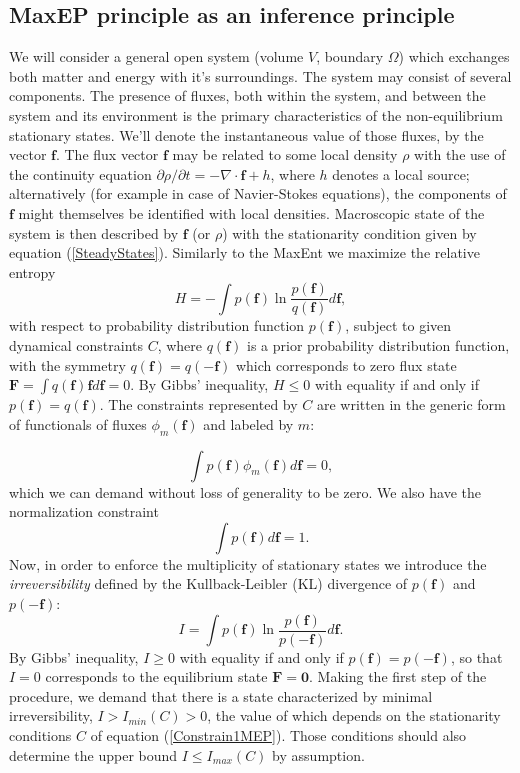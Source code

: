 \documentclass[a4paper,12pt]{article}
\begin{document}
\subsection{MaxEP principle as an inference principle}
\label{MaxEPInferenceSection}
We will consider a general open system (volume $V$, boundary $\Omega$) which exchanges both matter and energy with it's surroundings. The system may consist of several components.
The presence of fluxes, both within the system, and between the system and its environment is the primary characteristics of the non-equilibrium stationary states. We'll denote the instantaneous value of those fluxes, by the vector $\bm{f}$. The flux vector $\bm{f}$ may be related to some local density $\rho$ with the use of the continuity equation $\partial \rho / \partial t =  - \nabla \cdot \bm{f} + h$, where $h$ denotes a local source; alternatively (for example in case of Navier-Stokes equations), the components of $\bm{f}$ might themselves be identified with local densities. Macroscopic state of the system is then described by $\bm{f}$ (or $\rho$) with the stationarity condition given by equation (\ref{SteadyStates}).
Similarly to the MaxEnt we maximize the relative entropy
\begin{equation}
  H = - \int p(\bm{f})\ln \frac{p(\bm{f})}{q(\bm{f})} d\bm{f},
\end{equation}
with respect to probability distribution function $p(\bm{f})$, subject to given dynamical constraints $C$, where $q(\bm{f})$ is a prior probability distribution function, with the symmetry $q(\bm{f}) =q(\bm{-f})$ which corresponds to zero flux state $\bm{F}= \int q(\bm{f}) \bm{f} d\bm{f}=0 $.
By Gibbs' inequality, $H \leq 0$ with equality if and only if $p(\bm{f})=q(\bm{f})$.
The constraints represented by $C$ are written in the generic form of functionals of fluxes $\phi_m(\bm{f})$ and labeled by $m$:

\begin{equation}
\label{Constrain1MEP}
  \int p(\bm{f})\phi_m(\bm{f})d\bm{f} =0,
\end{equation}
which we can demand without loss of generality to be zero.
We also have the normalization constraint
\begin{equation}
\label{Constrain2MEP}
  \int p(\bm{f})d\bm{f} = 1.
\end{equation}
Now, in order to enforce the multiplicity of stationary states we introduce the \textit{irreversibility} defined by the Kullback-Leibler (KL) divergence of $p(\bm{f})$ and $p(-\bm{f})$:
\begin{equation}
\label{IrreversibilityMeasure}
  I= \int p(\bm{f}) \ln \frac{p(\bm{f})}{p(-\bm{f})} d\bm{f}.
\end{equation}
By Gibbs' inequality, $I \geq 0$ with equality if and only if $p(\bm{f})=p(-\bm{f})$, so that $I=0$ corresponds to the equilibrium state $\bm{F} = \bm{0} $.
Making the first step of the procedure, we demand that there is a state characterized by minimal irreversibility, $I>I_{min}(C)>0$, the value of which depends on the stationarity conditions $C$ of equation (\ref{Constrain1MEP}).
Those conditions should also determine the upper bound $I \leq I_{max}(C)$ by assumption.
\end{document}
